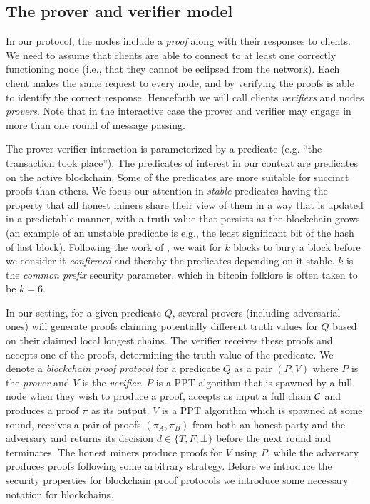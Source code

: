 \subsection{The prover and verifier model}
In our protocol, the nodes include a \emph{proof} along with their responses to clients.
We need to assume that clients are able to connect to at least one correctly functioning node (i.e., that they cannot be eclipsed from the network).
Each client makes the same request to every node, and by verifying the proofs is able to identify the correct response.
Henceforth we will call clients \textit{verifiers} and nodes \textit{provers}.
Note that in the interactive case the prover and verifier may engage in more than one round of message passing.

The prover-verifier interaction is parameterized by a predicate (e.g. ``the transaction took place'').
%
The predicates of interest in our context are predicates on the active
blockchain. Some of the predicates are more suitable for succinct proofs than
others. We focus our attention in \textit{stable} predicates having the property
that all honest miners share their view of them in a way that is updated in a
predictable manner, with a truth-value that persists as the blockchain grows (an
example of an unstable predicate is e.g., the least significant bit of the hash
of last block). Following the work of \cite{backbone}, we wait for $k$ blocks to
bury a block before we consider it \textit{confirmed} and thereby the predicates
depending on it stable. $k$ is the \textit{common prefix} security parameter,
which in bitcoin folklore is often taken to be $k = 6$.

In our setting, for a given predicate $Q$, several  provers (including
adversarial ones) will generate proofs claiming potentially different truth
values for $Q$ based on their claimed local longest chains. The verifier
receives these proofs and accepts one of the proofs, determining the truth value
of the predicate.  We denote a  \textit{blockchain proof protocol} for a
predicate $Q$ as a pair $(P, V)$ where $P$ is the \textit{prover} and $V$ is the
\textit{verifier}. $P$ is a PPT algorithm that is spawned by a full node when
they wish to produce a proof, accepts as input a full chain $\mathcal{C}$ and
produces a proof $\pi$ as its output. $V$ is a PPT algorithm which is spawned at
some round, receives a pair of proofs $(\pi_A, \pi_B)$ from both an honest party
and the adversary and returns its decision $d \in \{T, F, \bot\}$ before the
next round and terminates. The honest miners produce proofs for $V$ using $P$,
while the adversary produces proofs following some arbitrary strategy. Before we
introduce the security properties for blockchain proof protocols we introduce
some necessary notation for blockchains.

